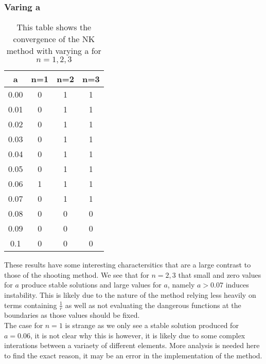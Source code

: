 \documentclass{article}
\begin{document}
\subsubsection{Varing a}
\begin{table}[H]
\centering
\begin{tabular}{|c|c|c|c|}
\hline
a & n=1  & n=2 & n=3 \\
\hline
0.00 & 0 & 1 & 1\\
0.01 & 0 & 1 & 1\\
0.02 & 0 & 1 & 1\\
0.03 & 0 & 1 & 1\\
0.04 & 0 & 1 & 1\\
0.05 & 0 & 1 & 1\\
0.06 & 1 & 1 & 1\\
0.07 & 0 & 1 & 1\\
0.08 & 0 & 0 & 0\\
0.09 & 0 & 0 & 0\\
0.1 & 0 & 0 & 0\\
\hline
\end{tabular}
\caption{This table shows the convergence of the NK method with varying a for $n=1,2,3$}
\end{table}
These results have some interesting charactersitics that are a large contrast to those of the shooting method. We see that for $n=2,3$ that small and zero values for $a$ produce stable solutions and large values for $a$, namely $a>0.07$ induces instability. This is likely due to the nature of the method relying less heavily on terms containing $\frac{1}{r}$ as well as not evaluating the dangerous functions at the boundaries as those values should be fixed. \\
The case for $n=1$ is strange as we only see a stable solution produced for $a=0.06$, it is not clear why this is however, it is likely due to some complex interations between a variaety of different elements. More analysis is needed here to find the exact reason, it may be an error in the implementation of the method. 
\end{document}
